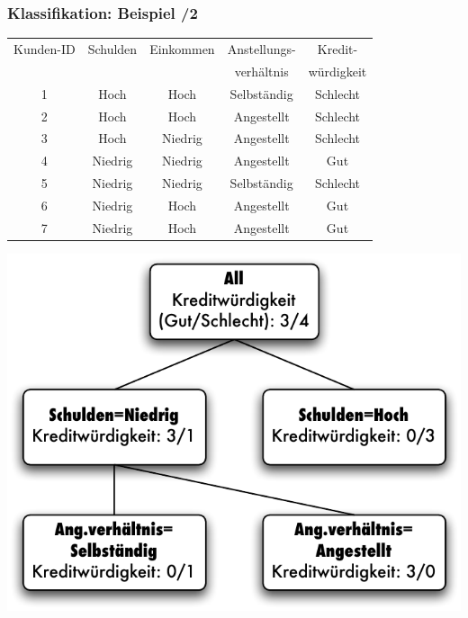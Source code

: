 \begin{frame}
\frametitle{Klassifikation: Beispiel /2}

{\tiny\begin{tabular}{|c|c|c|c|c|}
  \rowcolor{Gray}\hline
Kunden-ID & Schulden & Einkommen & Anstellungs- & Kredit- \\
\rowcolor{Gray}           &           &            & verhältnis   & würdigkeit \\
\hline\hline
1 & Hoch & Hoch & Selbständig & Schlecht \\
2 & Hoch & Hoch & Angestellt & Schlecht \\
3 & Hoch & Niedrig & Angestellt & Schlecht \\
4 & Niedrig & Niedrig & Angestellt & Gut \\
5 & Niedrig & Niedrig & Selbständig & Schlecht \\
6 & Niedrig & Hoch & Angestellt & Gut \\
7 & Niedrig & Hoch & Angestellt & Gut \\
\hline
\end{tabular}}

\raggedleft\includegraphics[scale=.5]{fig1/klassifikation.pdf}

\end{frame}


